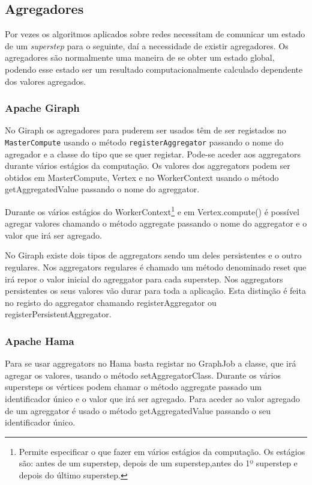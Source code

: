 \newpage

\subsection{Agregadores}
  Por vezes os algoritmos aplicados sobre redes necessitam de comunicar um 
estado de um \textit{superstep} para o seguinte, daí a necessidade de existir 
agregadores. Os agregadores são normalmente uma maneira de se obter um estado 
global, podendo esse estado ser um resultado computacionalmente calculado 
dependente dos valores agregados.

  \subsubsection*{Apache Giraph}
    No Giraph os agregadores para puderem ser usados têm de ser registados no \texttt{MasterCompute} usando o método \texttt{registerAggregator}
    passando o nome do agregador e a classe do tipo que se quer registar. Pode-se aceder aos aggregators durante vários estágios da computação.
    Os valores dos aggregators podem ser obtidos em MasterCompute, Vertex e no WorkerContext usando o método getAggregatedValue passando
    o nome do agreggator.
    
    Durante os vários estágios do WorkerContext\footnote{Permite 
especificar o que fazer em vários estágios da computação. Os estágios são: 
antes de um superstep, depois de um superstep,antes do 1º superstep e depois do 
último superstep.} e em Vertex.compute() é possível agregar valores chamando o 
método aggregate passando o nome do aggregator e o valor que irá ser agregado.
    
    No Giraph existe dois tipos de aggregators sendo um deles persistentes e o outro regulares. Nos aggregators regulares é chamado um método
    denominado reset que irá repor o valor inicial do agreggator para cada superstep. Nos aggregators persistentes os seus valores vão durar
    para toda a aplicação. Esta distinção é feita no registo do aggregator chamando registerAggregator 
    ou registerPersistentAggregator.
    
  \subsubsection*{Apache Hama}
    Para se usar aggregators no Hama basta registar no GraphJob a classe, que irá agregar os valores, usando o método
    setAggregatorClass. Durante os vários supersteps os vértices podem chamar o método aggregate passado um identificador único
    e o valor que irá ser agregado. Para aceder ao valor agregado de um agreggator é usado o método getAggregatedValue passando o seu 
    identificador único.
    
